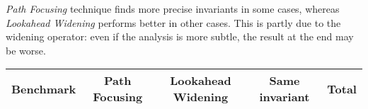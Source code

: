 \documentclass[a4paper,english,titlepage,11pt]{report}
\begin{document}
	\emph{Path Focusing} technique finds more precise invariants in some cases,
	whereas \emph{Lookahead Widening} performs better in other cases.
	This is partly due to the widening operator: even if the analysis is more
	subtle, the result at the end may be worse.

\begin{table}[!h]
\centering
\begin{tabular}{|c||c|c|c|c|} \hline 
Benchmark & Path Focusing & Lookahead Widening & Same invariant & Total \\
\hline \hline

\end{tabular}
\end{table}
\end{document}

